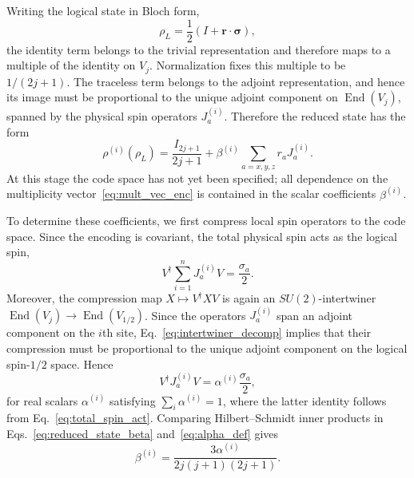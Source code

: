 \documentclass[10pt,twocolumn,superscriptaddress,aps,amsmath,amssymb,citeautoscript,floatfix,prx,longbibliography]{revtex4-2}
\theoremstyle{plain}
\theoremstyle{plain}
\theoremstyle{plain}
\theoremstyle{plain}
\theoremstyle{plain}
\theoremstyle{plain}
\begin{document}
Writing the logical state in Bloch form,
\[
    \rho_L=\frac12(I+\mathbf r\cdot\boldsymbol\sigma),
\]
the identity term belongs to the trivial representation and therefore maps to a multiple of the identity on $V_j$. Normalization fixes this multiple to be $1/(2j+1)$. The traceless term belongs to the adjoint representation, and hence its image must be proportional to the unique adjoint component on $\operatorname{End}(V_j)$, spanned by the physical spin operators $J_a^{(i)}$. Therefore the reduced state has the form
\begin{equation}\label{eq:reduced_state_beta}
    \rho^{(i)}(\rho_L)
    =
    \frac{I_{2j+1}}{2j+1}
    +
    \beta^{(i)}
    \sum_{a=x,y,z} r_a J_a^{(i)} .
\end{equation}
At this stage the code space has not yet been specified; all dependence on the multiplicity vector~\eqref{eq:mult_vec_enc} is contained in the scalar coefficients $\beta^{(i)}$.

To determine these coefficients, we first compress local spin operators to the code space. Since the encoding is covariant, the total physical spin acts as the logical spin,
\begin{equation}\label{eq:total_spin_act}
    V^\dagger \sum_{i=1}^n J_a^{(i)} V
    =
    \frac{\sigma_a}{2} .
\end{equation}
Moreover, the compression map $X\mapsto V^\dagger X V$ is again an $SU(2)$-intertwiner $\operatorname{End}(V_j)\rightarrow \operatorname{End}(V_{1/2})$. Since the operators $J_a^{(i)}$ span an adjoint component on the $i$th site, Eq.~\eqref{eq:intertwiner_decomp} implies that their compression must be proportional to the unique adjoint component on the logical spin-$1/2$ space. Hence
\begin{equation}\label{eq:alpha_def}
    V^\dagger J_a^{(i)} V
    =
    \alpha^{(i)}\frac{\sigma_a}{2},
\end{equation}
for real scalars $\alpha^{(i)}$ satisfying $\sum_i\alpha^{(i)}=1$, where the latter identity follows from Eq.~\eqref{eq:total_spin_act}. Comparing Hilbert--Schmidt inner products in Eqs.~\eqref{eq:reduced_state_beta} and~\eqref{eq:alpha_def} gives
\begin{equation}\label{eq:beta_through_alpha}
    \beta^{(i)}
    =
    \frac{3\alpha^{(i)}}{2j(j+1)(2j+1)} .
\end{equation}
\end{document}
